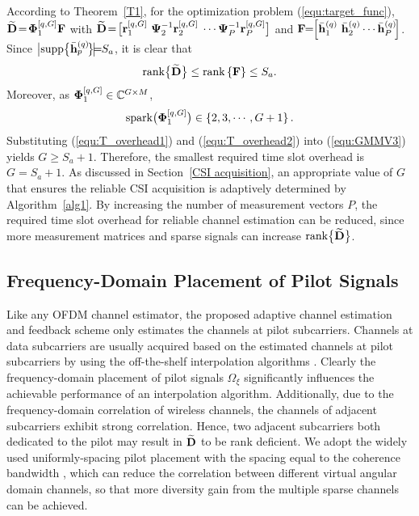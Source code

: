 \documentclass[final]{IEEEtran}
\begin{document}
 According to Theorem~\ref{T1}, for the optimization problem (\ref{equ:target_func}),
 $\widetilde{\bf D}\!=\!{\bf{\Phi}}_1^{[q,G]} {\bf F}$ with
 $\widetilde{\bf D}\!=\!\big[ {\bf r}_1^{[q,G]} ~ {\bf{\Psi}}_2^{-1} {\bf r}_2^{[q,G]}$ $\cdots
 {\bf{\Psi}}_{P}^{-1} {\bf r}_{P}^{[q,G]}\big]$ and ${\bf F}\!\!=\!\!\left[ \bar{\bf h}_1^{(q)} ~
 \bar{\bf h}_2^{(q)} \cdots \bar{\bf h}_{P}^{(q)} \!\right]$. Since $\big| {\rm supp}\big\{\bar{\bf h}_p^{(q)}\!
 \big\}\!\big|\!\!\!=\!\!S_a$, it is clear that
\begin{align}\label{equ:T_overhead1} %
 {\rm{rank}}\big\{ \widetilde{\bf D} \big\} \le {\rm{rank}}\left\{ {\bf F} \right\}\le S_a .
\end{align}
 Moreover, as ${\bf{\Phi}}_1^{[q,G]}\in \mathbb{C}^{G\times M}$,
\begin{align}\label{equ:T_overhead2}  %
 {\rm{spark}}\big( {\bf{\Phi}}_1^{[q,G]} \big) \in \left\{2,3,\cdots ,G+1\right\} .
\end{align}
 Substituting (\ref{equ:T_overhead1}) and (\ref{equ:T_overhead2}) into (\ref{equ:GMMV3})
 yields $G\ge S_a+1$. Therefore, the smallest required time slot overhead is $G=S_a+1$.
 As discussed in Section~\ref{CSI acquisition}, an appropriate value of $G$ that
 ensures the reliable CSI acquisition is adaptively determined by Algorithm~\ref{alg1}.
 By increasing the number of measurement vectors $P$, the required time slot overhead
 for reliable channel estimation can be reduced, since more measurement matrices
 and sparse signals can increase ${\rm{rank}}\big\{  \widetilde{\bf D}\big\}$.

\subsection{Frequency-Domain Placement of Pilot Signals}\label{S4.3}

 Like any OFDM channel estimator, the proposed adaptive channel estimation and feedback
 scheme only estimates the channels at pilot subcarriers. Channels at data subcarriers
 are usually acquired based on the estimated channels at pilot subcarriers by using the
 off-the-shelf interpolation algorithms \cite{matlab}.  Clearly the frequency-domain
 placement of pilot signals $\Omega_{\xi}$ significantly influences the achievable
 performance of an interpolation algorithm. Additionally, due to the frequency-domain
 correlation of wireless channels, the channels of adjacent subcarriers exhibit strong
 correlation. Hence, two adjacent subcarriers both dedicated to the pilot may result in
 $\widetilde{\bf D}$ to be rank deficient. We adopt the widely used uniformly-spacing pilot
 placement with the spacing equal to the coherence bandwidth \cite{matlab}, which can
 reduce the correlation between different virtual angular domain channels, so that more
 diversity gain from the multiple sparse channels can be achieved.
\end{document}
